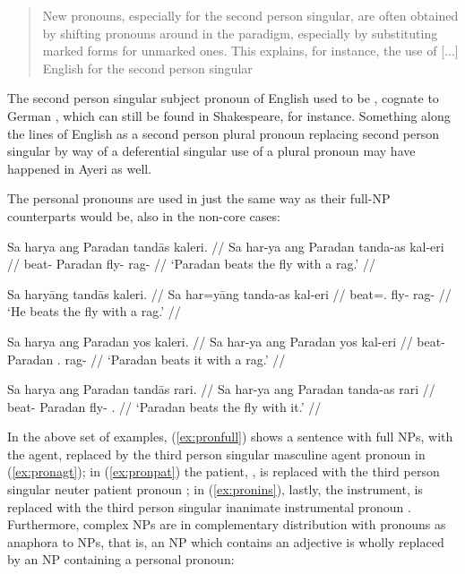 \blockcquote[42]{lehmann2015}{New pronouns, especially for the second person 
singular, are often obtained by shifting pronouns around in the paradigm,
especially by substituting marked forms for unmarked ones. This explains, for
instance, the use of [...] English  for the second person singular}

The second person singular subject pronoun of English used to be , 
cognate to German , which can still be found in Shakespeare, for 
instance. Something along the lines of English  as a second 
person plural pronoun replacing second person singular  by way of a 
deferential singular use of a plural pronoun \citep[you, pron., adj., and 
n.]{oed} may have happened in Ayeri as well.

The personal pronouns are used in just the same way as their full-NP 
counterparts would be, also in the non-core cases:

\pex\label{ex:perspro}
\a\label{ex:pronfull}\begingl
	\gla Sa harya ang Paradan tandās kaleri. //
	\glb Sa har-ya ang Paradan tanda-as kal-eri //
	\glc \AgtT{} beat-\TsgM{} \Aarg{} Paradan fly-\Parg{} rag-\Ins{} //
	\glft `Paradan beats the fly with a rag.' //
\endgl

\a\label{ex:pronagt}\begingl
	\gla Sa haryāng tandās kaleri. //
	\glb Sa har=yāng tanda-as kal-eri //
	\glc \AgtT{} beat=\TsgM{}.\Aarg{} fly-\Parg{} rag-\Ins{} //
	\glft `He beats the fly with a rag.' //
\endgl

\a\label{ex:pronpat}\begingl
	\gla Sa harya ang Paradan yos kaleri. //
	\glb Sa har-ya ang Paradan yos kal-eri //
	\glc \AgtT{} beat-\TsgM{} \Aarg{} Paradan \TsgN{}.\Parg{} rag-\Ins{} //
	\glft `Paradan beats it with a rag.' //
\endgl

\a\label{ex:pronins}\begingl
	\gla Sa harya ang Paradan tandās rari. //
	\glb Sa har-ya ang Paradan tanda-as rari //
	\glc \AgtT{} beat-\TsgM{} \Aarg{} Paradan fly-\Parg{} \TsgI{}.\Ins{} //
	\glft `Paradan beats the fly with it.' //
\endgl

\xe

In the above set of examples, (\ref{ex:pronfull}) shows a sentence with full
NPs, with the agent,  replaced by the third person
singular masculine agent pronoun  in (\ref{ex:pronagt}); in
(\ref{ex:pronpat}) the patient, , is replaced with the
third person singular neuter patient pronoun ; in
(\ref{ex:pronins}), lastly, the instrument,  is replaced
with the third person singular inanimate instrumental pronoun .
Furthermore, complex NPs are in complementary distribution with pronouns as
anaphora to NPs, that is, an NP which contains an adjective is wholly replaced
by an NP containing a personal pronoun:


